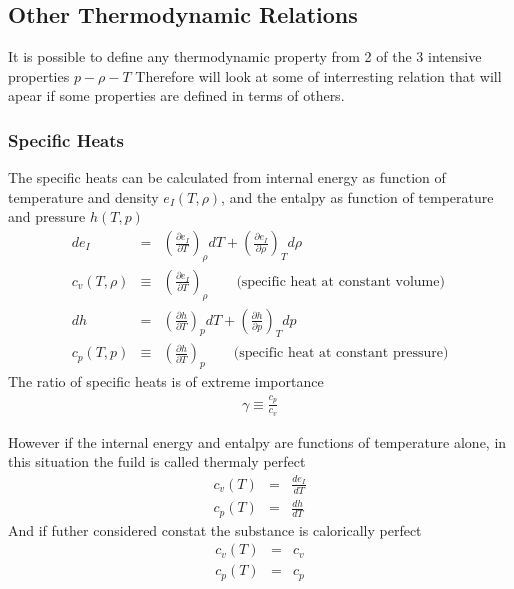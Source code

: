 \subsection{Other Thermodynamic Relations}
It is possible to define any thermodynamic property from 2 of the 3 intensive properties $p-\rho-T$
Therefore will look at some of interresting relation that will apear if some properties are defined in terms of others.

\subsubsection{Specific Heats}
The specific heats can be calculated from internal energy as function of temperature and density $e_I(T,\rho)$, and the entalpy as function of temperature and pressure $h(T,p)$     
\begin{eqnarray}
   de_I & = & \left( \frac{\partial e_I }{\partial T} \right)_{\rho} dT + \left( \frac{\partial e_I }{\partial \rho} \right)_{T} d\rho\\
   c_v(T,\rho) & \equiv & \left( \frac{\partial e_I }{\partial T} \right)_{\rho} \qquad \text{(specific heat at constant volume)} \\
   dh & = & \left( \frac{\partial h}{\partial T} \right)_{p} dT + \left( \frac{\partial h}{\partial p} \right)_{T} dp\\
   c_p(T,p) & \equiv & \left( \frac{\partial h}{\partial T} \right)_{p}  \qquad \text{(specific heat at constant pressure)} 
\end{eqnarray}
The ratio of specific heats is of extreme importance
\begin{eqnarray}
\gamma \equiv \frac{c_p}{c_v}
\end{eqnarray}


However if the internal energy and entalpy are functions of temperature alone, in this situation the fuild is called thermaly perfect   
\begin{eqnarray}
   c_v(T) & = & \frac{d e_I }{d T} \\ 
   c_p(T) & = & \frac{d h }{d T} 
\end{eqnarray}
And if futher considered constat the substance is calorically perfect
\begin{eqnarray}
   c_v(T) & = & c_v\\ 
   c_p(T) & = & c_p
\end{eqnarray}


